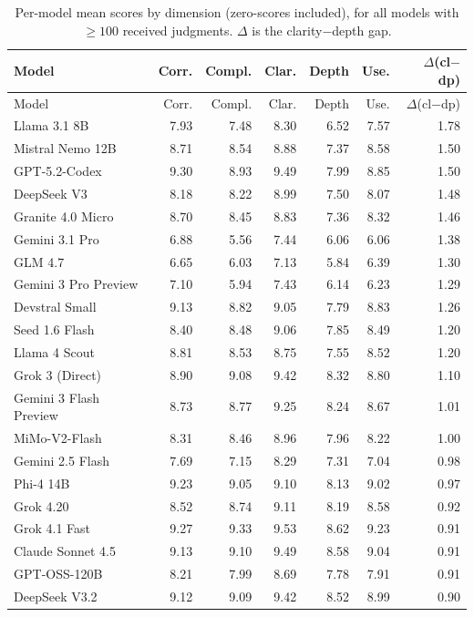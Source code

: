 \begin{longtable}{lrrrrrr}
\caption{Per-model mean scores by dimension (zero-scores included), for all models with $\geq 100$ received judgments. $\Delta$ is the clarity$-$depth gap.}\label{tab:dims}\\
\toprule
Model & Corr. & Compl. & Clar. & Depth & Use. & $\Delta$(cl$-$dp) \\
\midrule
\endfirsthead
\toprule
Model & Corr. & Compl. & Clar. & Depth & Use. & $\Delta$(cl$-$dp) \\
\midrule
\endhead
\midrule
\endfoot
\bottomrule
\endlastfoot
Llama 3.1 8B & 7.93 & 7.48 & 8.30 & 6.52 & 7.57 & 1.78 \\
Mistral Nemo 12B & 8.71 & 8.54 & 8.88 & 7.37 & 8.58 & 1.50 \\
GPT-5.2-Codex & 9.30 & 8.93 & 9.49 & 7.99 & 8.85 & 1.50 \\
DeepSeek V3 & 8.18 & 8.22 & 8.99 & 7.50 & 8.07 & 1.48 \\
Granite 4.0 Micro & 8.70 & 8.45 & 8.83 & 7.36 & 8.32 & 1.46 \\
Gemini 3.1 Pro & 6.88 & 5.56 & 7.44 & 6.06 & 6.06 & 1.38 \\
GLM 4.7 & 6.65 & 6.03 & 7.13 & 5.84 & 6.39 & 1.30 \\
Gemini 3 Pro Preview & 7.10 & 5.94 & 7.43 & 6.14 & 6.23 & 1.29 \\
Devstral Small & 9.13 & 8.82 & 9.05 & 7.79 & 8.83 & 1.26 \\
Seed 1.6 Flash & 8.40 & 8.48 & 9.06 & 7.85 & 8.49 & 1.20 \\
Llama 4 Scout & 8.81 & 8.53 & 8.75 & 7.55 & 8.52 & 1.20 \\
Grok 3 (Direct) & 8.90 & 9.08 & 9.42 & 8.32 & 8.80 & 1.10 \\
Gemini 3 Flash Preview & 8.73 & 8.77 & 9.25 & 8.24 & 8.67 & 1.01 \\
MiMo-V2-Flash & 8.31 & 8.46 & 8.96 & 7.96 & 8.22 & 1.00 \\
Gemini 2.5 Flash & 7.69 & 7.15 & 8.29 & 7.31 & 7.04 & 0.98 \\
Phi-4 14B & 9.23 & 9.05 & 9.10 & 8.13 & 9.02 & 0.97 \\
Grok 4.20 & 8.52 & 8.74 & 9.11 & 8.19 & 8.58 & 0.92 \\
Grok 4.1 Fast & 9.27 & 9.33 & 9.53 & 8.62 & 9.23 & 0.91 \\
Claude Sonnet 4.5 & 9.13 & 9.10 & 9.49 & 8.58 & 9.04 & 0.91 \\
GPT-OSS-120B & 8.21 & 7.99 & 8.69 & 7.78 & 7.91 & 0.91 \\
DeepSeek V3.2 & 9.12 & 9.09 & 9.42 & 8.52 & 8.99 & 0.90 \\

\end{longtable}
